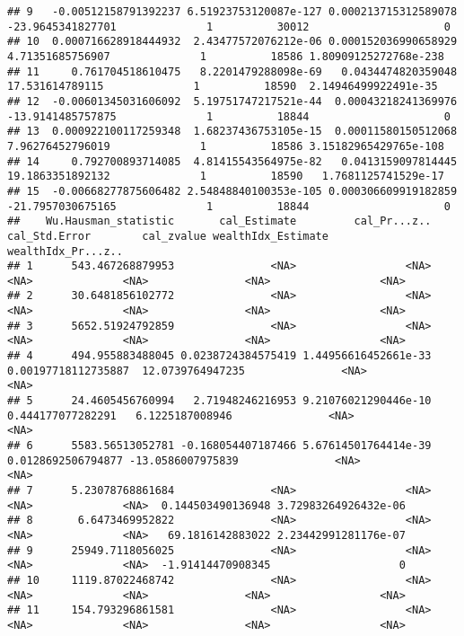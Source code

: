 \documentclass[
]{book}
\begin{document}
\begin{verbatim}
## 9   -0.00512158791392237 6.51923753120087e-127 0.000213715312589078 -23.9645341827701              1          30012                     0
## 10  0.000716628918444932  2.43477572076212e-06 0.000152036990658929  4.71351685756907              1          18586 1.80909125272768e-238
## 11     0.761704518610475   8.2201479288098e-69   0.0434474820359048   17.531614789115              1          18590  2.14946499922491e-35
## 12  -0.00601345031606092  5.19751747217521e-44  0.00043218241369976 -13.9141485757875              1          18844                     0
## 13  0.000922100117259348  1.68237436753105e-15  0.00011580150512068  7.96276452796019              1          18586 3.15182965429765e-108
## 14     0.792700893714085  4.81415543564975e-82   0.0413159097814445  19.1863351892132              1          18590   1.7681125741529e-17
## 15  -0.00668277875606482 2.54848840100353e-105 0.000306609919182859 -21.7957030675165              1          18844                     0
##    Wu.Hausman_statistic       cal_Estimate         cal_Pr...z..       cal_Std.Error        cal_zvalue wealthIdx_Estimate   wealthIdx_Pr...z..
## 1      543.467268879953               <NA>                 <NA>                <NA>              <NA>               <NA>                 <NA>
## 2      30.6481856102772               <NA>                 <NA>                <NA>              <NA>               <NA>                 <NA>
## 3      5652.51924792859               <NA>                 <NA>                <NA>              <NA>               <NA>                 <NA>
## 4      494.955883488045 0.0238724384575419 1.44956616452661e-33 0.00197718112735887  12.0739764947235               <NA>                 <NA>
## 5      24.4605456760994   2.71948246216953 9.21076021290446e-10   0.444177077282291   6.1225187008946               <NA>                 <NA>
## 6      5583.56513052781 -0.168054407187466 5.67614501764414e-39  0.0128692506794877 -13.0586007975839               <NA>                 <NA>
## 7      5.23078768861684               <NA>                 <NA>                <NA>              <NA>  0.144503490136948 3.72983264926432e-06
## 8       6.6473469952822               <NA>                 <NA>                <NA>              <NA>   69.1816142883022 2.23442991281176e-07
## 9      25949.7118056025               <NA>                 <NA>                <NA>              <NA>  -1.91414470908345                    0
## 10     1119.87022468742               <NA>                 <NA>                <NA>              <NA>               <NA>                 <NA>
## 11     154.793296861581               <NA>                 <NA>                <NA>              <NA>               <NA>                 <NA>

\end{verbatim}
\end{document}
